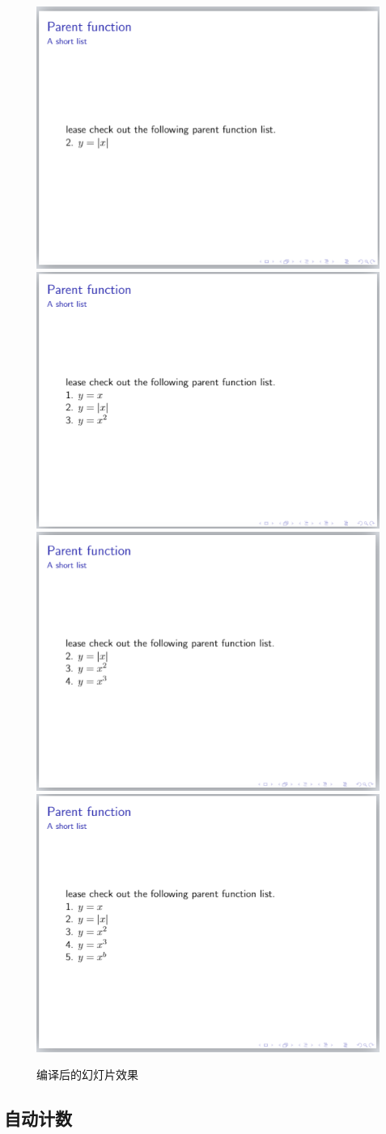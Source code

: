 \begin{itemize}
          \begin{figure}[htbp]
              \centering
              \includegraphics[width = 0.45\linewidth]{images/ch_9/NEWexample3_1.png}
              \includegraphics[width = 0.45\linewidth]{images/ch_9/NEWexample3_2.png}
              \includegraphics[width = 0.45\linewidth]{images/ch_9/NEWexample3_3.png}
              \includegraphics[width = 0.45\linewidth]{images/ch_9/NEWexample3_4.png}
              \caption{编译后的幻灯片效果}
              \label{fig:915}
          \end{figure}
\end{itemize}

\subsection{自动计数}

